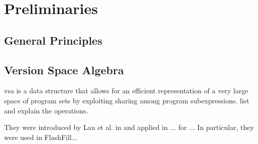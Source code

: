 \chapter{Preliminaries}
\label{chapter:preliminaries}


\section{General Principles}
\label{sec:general-principles}




\section{Version Space Algebra}
\label{sec:vsa}

\gls{vsa} is a data structure that allows for an efficient representation of a
very large space of program sets by exploiting sharing among program
subexpressions.  {list and explain the operations}.

They were introduced by Lau et al. in \cite{Lau:2000} and applied in ... for ...
In particular, they were used in FlashFill...


